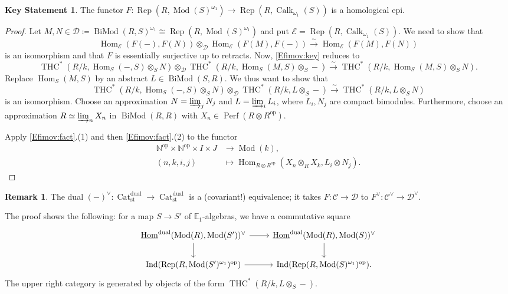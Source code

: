 \documentclass[draft]{amsart}
\newcommand{\NN}{\mathbb{N}}
\newcommand{\EE}{\mathbb{E}}
\newcommand{\ul}[1]{\underline{#1}}
\newcommand{\cat}[1]{\mathcal{#1}}
\newcommand{\op}{\mathrm{op}}
\newcommand{\isoto}{\mathbin{\xrightarrow{\sim}}}
\newcommand{\blank}{-} %
\DeclareMathOperator{\Hom}{Hom}
\DeclareMathOperator{\iHom}{\ul{Hom}}
\DeclareMathOperator{\Ind}{Ind}
\DeclareMathOperator{\Cat}{Cat}
\DeclareMathOperator{\Mod}{Mod}
\DeclareMathOperator{\Perf}{Perf}
\DeclareMathOperator{\Calk}{Calk}
\DeclareMathOperator{\BiMod}{BiMod}
\DeclareMathOperator{\THC}{THC}
\DeclareMathOperator{\Rep}{Rep}
\theoremstyle{definition}
\newtheorem{rem}[thm]{Remark}
\newtheorem{key}[thm]{Key Statement}
\begin{document}
\begin{key}
The functor $F\colon \Rep(R, \Mod(S)^{\omega_1}) \to \Rep(R, \Calk_{\omega_1}(S))$ is a homological epi.
\end{key}
\begin{proof}
Let $M, N \in \cat D \coloneqq \BiMod(R,S)^{\omega_1} \cong \Rep(R, \Mod(S)^{\omega_1})$ and put $\cat E = \Rep(R, \Calk_{\omega_1}(S))$. We need to show that
\begin{equation}\label{Efimov:key}
\Hom_{\cat E}(F(\blank), F(N)) \otimes_{\cat D} \Hom_{\cat E}(F(M), F(\blank)) \isoto \Hom_{\cat E}(F(M), F(N))
\end{equation}
is an isomorphism and that $F$ is essentially surjective up to retracts. Now, \eqref{Efimov:key} reduces to
\[
\THC^*(R/k, \Hom_S(\blank, S)\otimes_SN) \otimes_{\cat D} \THC^*(R/k, \Hom_S(M,S)\otimes_S \blank) \isoto
\THC^*(R/k, \Hom_S(M,S)\otimes_SN).
\]
Replace $\Hom_S(M,S)$ by an abstract $L\in \BiMod(S,R)$. We thus want to show that
\[
\THC^*(R/k, \Hom_S(\blank,S)\otimes_S N) \otimes_{\cat D} \THC^*(R/k, L\otimes_S\blank)\isoto \THC^*(R/k, L\otimes_SN)
\]
is an isomorphism. Choose an approximation $N = \varinjlim_j N_j$ and $L = \varinjlim_i L_i$, where $L_i, N_j$ are compact bimodules. Furthermore, choose an approximation $R \simeq \varinjlim_n X_n$ in $\BiMod(R,R)$ with $X_n \in \Perf(R\otimes R^{\op})$.

Apply \cref{Efimov:fact}.(1) and then \cref{Efimov:fact}.(2) to the functor
\begin{align*}
\NN^\op \times \NN^\op \times I\times J &\to \Mod(k), \\
(n,k,i,j) &\mapsto \Hom_{R\otimes R^\op}(X_n\otimes_R X_k, L_i\otimes N_j).
\end{align*}
\end{proof}

\begin{rem}
The dual $(\blank)^\vee\colon \Cat^{\mathrm{dual}}_{\mathrm{st}} \to \Cat^{\mathrm{dual}}_{\mathrm{st}}$ is a (covariant!) equivalence; it takes $F\colon \cat C\to \cat D$ to $F^\vee \colon \cat C^\vee \to \cat D^\vee$.
\end{rem}

The proof shows the following: for a map $S\to S'$ of $\EE_1$-algebras, we have a commutative square
\[
\begin{tikzcd}
\iHom^{\mathrm{dual}}(\Mod(R), \Mod(S'))^\vee \ar[r] \ar[d]
& \iHom^{\mathrm{dual}}(\Mod(R), \Mod(S))^\vee \ar[d] \\
\Ind(\Rep(R, \Mod(S')^{\omega_1})^{\op}) \ar[r] & \Ind(\Rep(R, \Mod(S)^{\omega_1})^\op).
\end{tikzcd}
\]
The upper right category is generated by objects of the form $\THC^*(R/k, L\otimes_S\blank)$.
\end{document}
